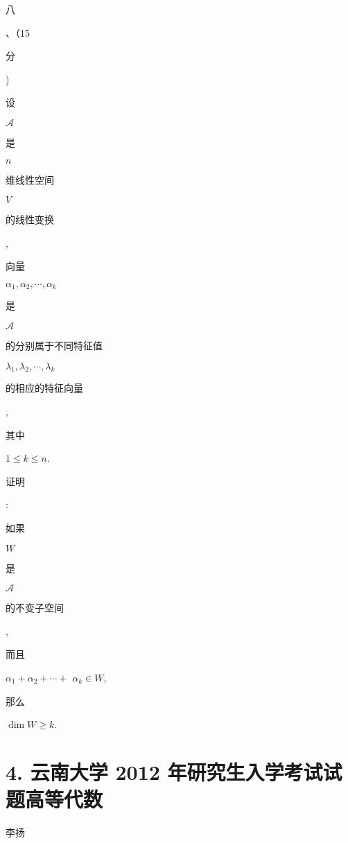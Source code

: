 \documentclass[10pt]{article}
\begin{document}
\begin{CJK}{UTF8}{mj}八\end{CJK}、（15 \begin{CJK}{UTF8}{mj}分\end{CJK}) \begin{CJK}{UTF8}{mj}设\end{CJK} $\mathscr{A}$ \begin{CJK}{UTF8}{mj}是\end{CJK} $n$ \begin{CJK}{UTF8}{mj}维线性空间\end{CJK} $V$ \begin{CJK}{UTF8}{mj}的线性变换\end{CJK}, \begin{CJK}{UTF8}{mj}向量\end{CJK} $\alpha_{1}, \alpha_{2}, \cdots, \alpha_{k}$ \begin{CJK}{UTF8}{mj}是\end{CJK} $\mathscr{A}$ \begin{CJK}{UTF8}{mj}的分别属于不同特征值\end{CJK} $\lambda_{1}, \lambda_{2}, \cdots, \lambda_{k}$ \begin{CJK}{UTF8}{mj}的相应的特征向量\end{CJK}, \begin{CJK}{UTF8}{mj}其中\end{CJK} $1 \leqslant k \leqslant n$. \begin{CJK}{UTF8}{mj}证明\end{CJK}: \begin{CJK}{UTF8}{mj}如果\end{CJK} $W$ \begin{CJK}{UTF8}{mj}是\end{CJK} $\mathscr{A}$ \begin{CJK}{UTF8}{mj}的不变子空间\end{CJK}, \begin{CJK}{UTF8}{mj}而且\end{CJK} $\alpha_{1}+\alpha_{2}+\cdots+$ $\alpha_{k} \in W$, \begin{CJK}{UTF8}{mj}那么\end{CJK} $\operatorname{dim} W \geqslant k$.

\section{4. 云南大学 2012 年研究生入学考试试题高等代数}
\begin{CJK}{UTF8}{mj}李扬\end{CJK}
\end{document}
